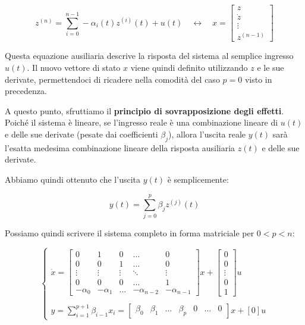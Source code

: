 \documentclass[a4paper,12pt]{article}
\begin{document}
	\[
	z^{(n)} = \sum_{i=0}^{n-1} -\alpha_i(t)z^{(i)}(t) + u(t) \quad \longleftrightarrow \quad x = \begin{bmatrix} z \\ \dot{z} \\ \vdots \\ z^{(n-1)} \end{bmatrix}
	\]
	
	Questa equazione ausiliaria descrive la risposta del sistema al semplice ingresso $u(t)$. Il nuovo vettore di stato $x$ viene quindi definito utilizzando $z$ e le sue derivate, permettendoci di ricadere nella comodità del caso $p=0$ visto in precedenza.
	
	A questo punto, sfruttiamo il \textbf{principio di sovrapposizione degli effetti}. Poiché il sistema è lineare, se l'ingresso reale è una combinazione lineare di $u(t)$ e delle sue derivate (pesate dai coefficienti $\beta_j$), allora l'uscita reale $y(t)$ sarà l'esatta medesima combinazione lineare della risposta ausiliaria $z(t)$ e delle sue derivate.
	
	Abbiamo quindi ottenuto che l'uscita $y(t)$ è semplicemente:
	
	\[
	y(t) = \sum_{j=0}^{p} \beta_j z^{(j)}(t)
	\]
	
	Possiamo quindi scrivere il sistema completo in forma matriciale per $0 < p < n$:
	
	\[
	\begin{cases}
		\dot{x} = 
		\left[
		\begin{array}{c|cccc} 
			0 & 1 & 0 & \dots & 0 \\ 
			0 & 0 & 1 & \dots & 0 \\ 
			\vdots & \vdots & \vdots & \ddots & \vdots \\ 
			0 & 0 & 0 & \dots & 1 \\ 
			\hline
			-\alpha_0 & -\alpha_1 & \dots & -\alpha_{n-2} & -\alpha_{n-1} 
		\end{array}
		\right] 
		x + 
		\begin{bmatrix} 
			0 \\ 
			0 \\ 
			\vdots \\ 
			0 \\ 
			1 
		\end{bmatrix} 
		u 
		\\
		\\
		y = \sum_{i=1}^{p+1} \beta_{i-1}x_i = 
		\begin{bmatrix} 
			\beta_0 & \beta_1 & \dots & \beta_p & 0 & \dots & 0 
		\end{bmatrix} 
		x + [0] u
	\end{cases}
	\]
	
\end{document}
